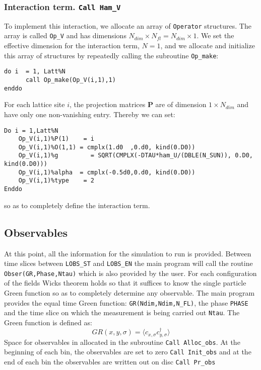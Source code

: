 
\subsubsection{Interaction term. \texttt{Call Ham\_V}}
To implement this interaction, we allocate an array of \texttt{Operator} structures. The array is called  \texttt{Op\_V} and has dimensions $N_{dim}\times N_{fl}=N_{dim} \times 1$. 
We set the effective dimension for the interaction term, $N=1$, and  we allocate and initialize this array of structures by repeatedly calling the subroutine \texttt{Op\_make}: 
\begin{verbatim}
do i  = 1, Latt%N
      call Op_make(Op_V(i,1),1)
enddo
\end{verbatim}
For each lattice site $i$, the projection matrices ${\bm P}$ are of dimension $1\times N_{dim} $ and have only one non-vanishing entry. Thereby we can set:
\begin{verbatim}
Do i = 1,Latt%N
    Op_V(i,1)%P(1)    = i
    Op_V(i,1)%O(1,1) = cmplx(1.d0  ,0.d0, kind(0.D0))
    Op_V(i,1)%g         = SQRT(CMPLX(-DTAU*ham_U/(DBLE(N_SUN)), 0.D0, kind(0.D0)))
    Op_V(i,1)%alpha  = cmplx(-0.5d0,0.d0, kind(0.D0))
    Op_V(i,1)%type    = 2
Enddo
\end{verbatim}
so as to completely define the interaction term. 


\subsection{Observables}

At this point, all the information   for the simulation to run is provided.   Between  time slices between  \texttt{LOBS\_ST}  and 
\texttt{LOBS\_EN}   the main program will call the routine  \texttt{Obser(GR,Phase,Ntau)}   which is also provided by the user.  For each configuration of the  fields Wicks theorem holds so that it suffices 
to  know the single particle Green function so as to completely determine  any observable. 
The main program provides the   equal time Green function: 
\texttt{GR(Ndim,Ndim,N\_FL)}, the phase \texttt{PHASE} and the time slice on which the measurement is being carried out \texttt{Ntau}.   The Green function is defined as: 
\begin{equation}
	 GR(x,y,\sigma)  = \langle c^{\phantom{\dagger}}_{x,\sigma} c^{\dagger}_{y,\sigma}  \rangle
\end{equation}
Space for observables in allocated in the  subroutine \texttt{Call Alloc\_obs}. At the beginning of each bin, the  observables are set to zero \texttt{Call Init\_obs} and at the end of each bin the observables are written out on disc \texttt{Call Pr\_obs}



